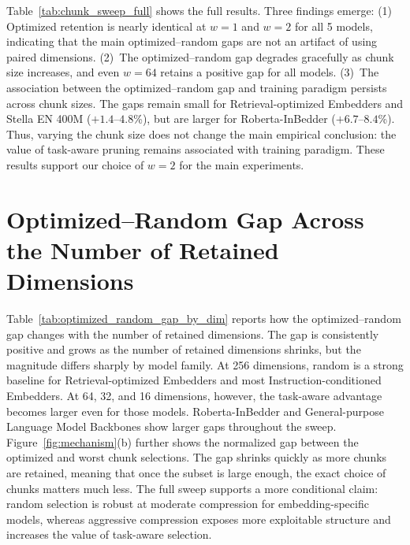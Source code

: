 \documentclass[11pt,a4paper]{article}
\begin{document}
Table~\ref{tab:chunk_sweep_full} shows the full results. Three findings emerge: (1) Optimized retention is nearly identical at $w = 1$ and $w = 2$ for all 5 models, indicating that the main optimized–random gaps are not an artifact of using paired dimensions. (2)~The optimized--random gap degrades gracefully as chunk size increases, and even $w = 64$ retains a positive gap for all models. (3)~The association between the optimized--random gap and training paradigm persists across chunk sizes. The gaps remain small for Retrieval-optimized Embedders and Stella EN 400M ($+1.4$--$4.8$\%), but are larger for Roberta-InBedder ($+6.7$--$8.4$\%). Thus, varying the chunk size does not change the main empirical conclusion: the value of task-aware pruning remains associated with training paradigm. These results support our choice of $w = 2$ for the main experiments.

\section{Optimized--Random Gap Across the Number of Retained Dimensions}
\label{sec:gap_by_dim}

Table~\ref{tab:optimized_random_gap_by_dim} reports how the optimized–random gap changes with the number of retained dimensions. The gap is consistently positive and grows as the number of retained dimensions shrinks, but the magnitude differs sharply by model family. At 256 dimensions, random is a strong baseline for Retrieval-optimized Embedders and most Instruction-conditioned Embedders. At 64, 32, and 16 dimensions, however, the task-aware advantage becomes larger even for those models. Roberta-InBedder and General-purpose Language Model Backbones show larger gaps throughout the sweep. Figure~\ref{fig:mechanism}(b) further shows the normalized gap between the optimized and worst chunk selections. The gap shrinks quickly as more chunks are retained, meaning that once the subset is large enough, the exact choice of chunks matters much less. The full sweep supports a more conditional claim: random selection is robust at moderate compression for embedding-specific models, whereas aggressive compression exposes more exploitable structure and increases the value of task-aware selection. 
\end{document}
